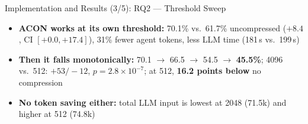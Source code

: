 \documentclass[aspectratio=169,10pt]{beamer}
\begin{document}
\begin{frame}{Implementation and Results (3/5): RQ2 --- Threshold Sweep}
\vspace{0.1cm}
\footnotesize
\begin{itemize}
  \item \textbf{ACON works at its own threshold:} 70.1\% vs.\ 61.7\% uncompressed
        ($+8.4$, CI $[+0.0,+17.4]$), 31\% fewer agent tokens, less LLM time (181\,s vs.\ 199\,s)
  \item \textbf{Then it falls monotonically:} 70.1 $\to$ 66.5 $\to$ 54.5 $\to$ \textbf{45.5\%};
        4096 vs.\ 512: $+53/-12$, $p=2.8\times10^{-7}$; at 512, \textbf{16.2 points below} no compression
  \item \textbf{No token saving either:} total LLM input is lowest at 2048 (71.5k) and higher at 512 (74.8k)
\end{itemize}
\end{frame}
\end{document}
